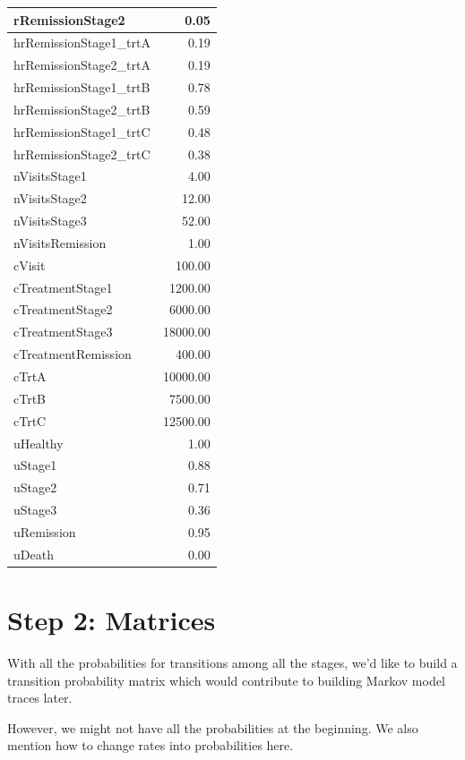 \documentclass[
  letterpaper,
  DIV=11,
  numbers=noendperiod,
  oneside]{scrartcl}
\begin{document}
\begin{table}
\begin{tabular}[t]{l|r}
\hline
rRemissionStage2 & 0.05\\
\hline
hrRemissionStage1\_trtA & 0.19\\
\hline
hrRemissionStage2\_trtA & 0.19\\
\hline
hrRemissionStage1\_trtB & 0.78\\
\hline
hrRemissionStage2\_trtB & 0.59\\
\hline
hrRemissionStage1\_trtC & 0.48\\
\hline
hrRemissionStage2\_trtC & 0.38\\
\hline
nVisitsStage1 & 4.00\\
\hline
nVisitsStage2 & 12.00\\
\hline
nVisitsStage3 & 52.00\\
\hline
nVisitsRemission & 1.00\\
\hline
cVisit & 100.00\\
\hline
cTreatmentStage1 & 1200.00\\
\hline
cTreatmentStage2 & 6000.00\\
\hline
cTreatmentStage3 & 18000.00\\
\hline
cTreatmentRemission & 400.00\\
\hline
cTrtA & 10000.00\\
\hline
cTrtB & 7500.00\\
\hline
cTrtC & 12500.00\\
\hline
uHealthy & 1.00\\
\hline
uStage1 & 0.88\\
\hline
uStage2 & 0.71\\
\hline
uStage3 & 0.36\\
\hline
uRemission & 0.95\\
\hline
uDeath & 0.00\\
\hline
\end{tabular}
\end{table}

\hypertarget{step-2-matrices}{%
\section{Step 2: Matrices}\label{step-2-matrices}}

With all the probabilities for transitions among all the stages, we'd
like to build a transition probability matrix which would contribute to
building Markov model traces later.

However, we might not have all the probabilities at the beginning. We
also mention how to change rates into probabilities here.
\end{document}
